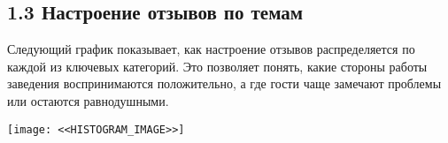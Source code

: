 \documentclass[a4paper,12pt]{extarticle}
\begin{document}
\subsection*{1.3 Настроение отзывов по темам}
\noindent
Следующий график показывает, как настроение отзывов распределяется по каждой из ключевых категорий.
Это позволяет понять, какие стороны работы заведения воспринимаются положительно, а где гости чаще замечают проблемы или остаются равнодушными.

\vspace{1em}
\begin{center}
    \texttt{[image: <<HISTOGRAM\_IMAGE>>]}
\end{center}
\vspace{1em}
\end{document}
